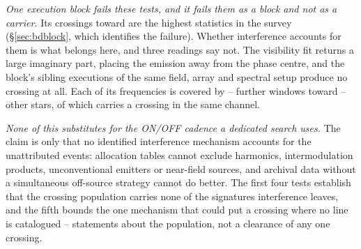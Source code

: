 \emph{One execution block fails these tests, and it fails them as a block
and not as a carrier.} Its \DqBlockNCross{} crossings toward
\LgVerRejectStar{} are the \DqBlockNCross{} highest statistics in the survey
(\S\ref{sec:bdblock}, which identifies the failure). Whether interference
accounts for them is what belongs here, and three readings say not. The
visibility fit returns a large imaginary part,
placing the emission away from the phase centre, and the block's
\BdNSibling{} sibling executions of the same field, array and spectral setup
produce no crossing at all. Each of its frequencies is covered by
\DqOtherWinLo--\DqOtherWinHi{} further windows toward
\DqOtherStarLo--\DqOtherStarHi{} other stars, of which \DqOtherSame{} carries
a crossing in the same channel.

\emph{None of this substitutes for the ON/OFF cadence a dedicated search
uses.} The claim is only that no
identified interference mechanism accounts for the unattributed events:
allocation tables cannot exclude harmonics, intermodulation products,
unconventional emitters or near-field sources, and archival data without a
simultaneous off-source strategy cannot do better. The first four tests
establish that the crossing population carries none of the signatures
interference leaves, and the fifth bounds the one mechanism that could put a
crossing where no line is catalogued -- statements about the population, not
a clearance of any one crossing.

